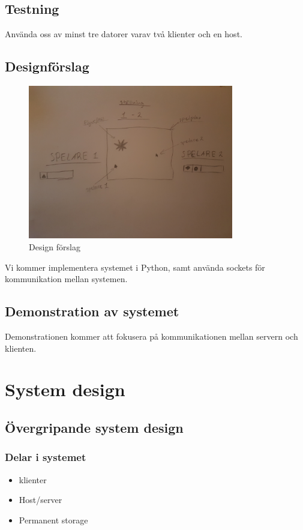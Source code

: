 \documentclass[a4paper]{article}
\begin{document}
\subsection{Testning}
Använda oss av minst tre datorer varav två klienter och en host.

\subsection{Designförslag}
\begin{figure}[H]
\includegraphics[width=0.8\textwidth]{designf_rslag.jpeg}
\caption{Design förslag}
\end{figure}

Vi kommer implementera systemet i Python, samt använda sockets för kommunikation mellan
systemen.

\subsection{Demonstration av systemet}
Demonstrationen kommer att fokusera på kommunikationen mellan servern och klienten.

\section{System design}
\subsection{Övergripande system design}
\subsubsection{Delar i systemet}
\begin{itemize}
\item klienter
\item Host/server
\item Permanent storage
\end{itemize}
\end{document}
